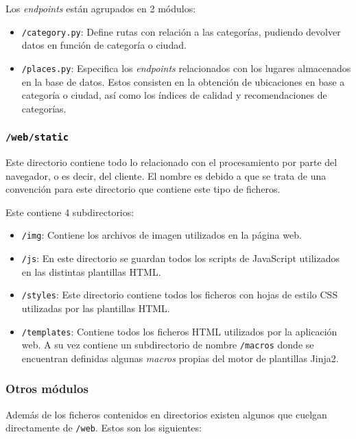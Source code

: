 Los \textit{endpoints} están agrupados en 2 módulos:
\begin{itemize}
	\item \texttt{/category.py}: Define rutas con relación a las categorías, pudiendo devolver datos en función de categoría o ciudad.
	\item \texttt{/places.py}: Especifica los \textit{endpoints} relacionados con los lugares almacenados en la base de datos. Estos consisten en la obtención de ubicaciones en base a categoría o ciudad, así como los índices de calidad y recomendaciones de categorías.
\end{itemize}

\subsubsection{\texttt{/web/static}}
Este directorio contiene todo lo relacionado con el procesamiento por parte del navegador, o es decir, del cliente. El nombre es debido a que se trata de una convención para este directorio que contiene este tipo de ficheros.

Este contiene 4 subdirectorios:
\begin{itemize}
	\item \texttt{/img}: Contiene los archivos de imagen utilizados en la página web.
	\item \texttt{/js}: En este directorio se guardan todos los scripts de JavaScript utilizados en las distintas plantillas HTML.
	\item \texttt{/styles}: Este directorio contiene todos los ficheros con hojas de estilo CSS utilizadas por las plantillas HTML.
	\item \texttt{/templates}: Contiene todos los ficheros HTML utilizados por la aplicación web. A su vez contiene un subdirectorio de nombre \texttt{/macros} donde se encuentran definidas algunas \textit{macros} propias del motor de plantillas Jinja2.
\end{itemize} 

\subsubsection{Otros módulos}
Además de los ficheros contenidos en directorios existen algunos que cuelgan directamente de \texttt{/web}. Estos son los siguientes:

